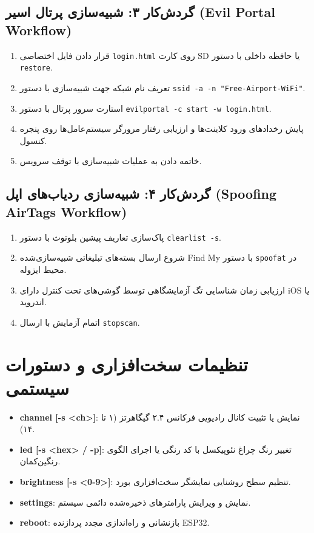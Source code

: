 \documentclass[11pt,a4paper]{article}
\newcommand{\lr}[1]{\foreignlanguage{english}{#1}}
\newcommand{\en}[1]{\lr{#1}}
\begin{document}
\subsection{گردش‌کار ۳: شبیه‌سازی پرتال اسیر \en{(Evil Portal Workflow)}}
\begin{enumerate}
    \item قرار دادن فایل اختصاصی \lr{\texttt{login.html}} روی کارت SD یا حافظه داخلی با دستور \lr{\texttt{restore}}.
    \item تعریف نام شبکه جهت شبیه‌سازی با دستور \lr{\texttt{ssid -a -n "Free-Airport-WiFi"}}.
    \item استارت سرور پرتال با دستور \lr{\texttt{evilportal -c start -w login.html}}.
    \item پایش رخدادهای ورود کلاینت‌ها و ارزیابی رفتار مرورگر سیستم‌عامل‌ها روی پنجره کنسول.
    \item خاتمه دادن به عملیات شبیه‌سازی با توقف سرویس.
\end{enumerate}

\subsection{گردش‌کار ۴: شبیه‌سازی ردیاب‌های اپل \en{(Spoofing AirTags Workflow)}}
\begin{enumerate}
    \item پاک‌سازی تعاریف پیشین بلوتوث با دستور \lr{\texttt{clearlist -s}}.
    \item شروع ارسال بسته‌های تبلیغاتی شبیه‌سازی‌شده \en{Find My} با دستور \lr{\texttt{spoofat}} در محیط ایزوله.
    \item ارزیابی زمان شناسایی تگ آزمایشگاهی توسط گوشی‌های تحت کنترل دارای \en{iOS} یا اندروید.
    \item اتمام آزمایش با ارسال \lr{\texttt{stopscan}}.
\end{enumerate}

\section{تنظیمات سخت‌افزاری و دستورات سیستمی}
\begin{itemize}
    \item \lr{\textbf{channel [-s <ch>]}:} نمایش یا تثبیت کانال رادیویی فرکانس ۲.۴ گیگاهرتز (۱ تا ۱۴).
    \item \lr{\textbf{led [-s <hex> / -p]}:} تغییر رنگ چراغ نئوپیکسل با کد رنگی یا اجرای الگوی رنگین‌کمان.
    \item \lr{\textbf{brightness [-s <0-9>]}:} تنظیم سطح روشنایی نمایشگر سخت‌افزاری بورد.
    \item \lr{\textbf{settings}:} نمایش و ویرایش پارامترهای ذخیره‌شده دائمی سیستم.
    \item \lr{\textbf{reboot}:} بازنشانی و راه‌اندازی مجدد پردازنده \en{ESP32}.
\end{itemize}
\end{document}
